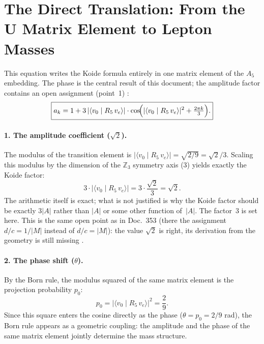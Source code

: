 \section{The Direct Translation: From the U Matrix Element to Lepton Masses}

This equation writes the Koide formula entirely in one matrix element of the
$A_5$ embedding. The phase is the central result of this document; the amplitude
factor contains an open assignment (point~1) \SM:
\begin{equation}\label{eq:direkt}
  \boxed{a_k = 1 + 3\,|\langle v_0 \mid R_5\, v_e\rangle|\cdot
    \cos\!\Bigl(|\langle v_0 \mid R_5\, v_e\rangle|^2 + \tfrac{2\pi k}{3}\Bigr).}
\end{equation}

\paragraph{1. The amplitude coefficient ($\sqrt2$).}
The modulus of the transition element is
$|\langle v_0 \mid R_5\, v_e\rangle| = \sqrt{2/9} = \sqrt2/3$.
Scaling this modulus by the dimension of the $\mathbb{Z}_3$ symmetry axis (3)
yields exactly the Koide factor:
\[
  3\cdot|\langle v_0 \mid R_5\, v_e\rangle| = 3\cdot\frac{\sqrt2}{3} = \sqrt2.
\]
The arithmetic itself is exact; what is not justified is why the Koide factor
should be exactly $3|A|$ rather than $|A|$ or some other function of~$|A|$. The
factor~$3$ is set here. This is the same open point as in Doc.~353 (there the
assignment $d/c = 1/|M|$ instead of $d/c = |M|$): the value $\sqrt2$ is right, its
derivation from the geometry is still missing \SM.

\paragraph{2. The phase shift ($\theta$).}
By the Born rule, the modulus squared of the same matrix element is the
projection probability $p_0$:
\[
  p_0 = |\langle v_0 \mid R_5\, v_e\rangle|^2 = \frac{2}{9}.
\]
Since this square enters the cosine directly as the phase ($\theta = p_0 = 2/9$
rad), the Born rule appears as a geometric coupling: the amplitude and the
phase of the same matrix element jointly determine the mass structure.

